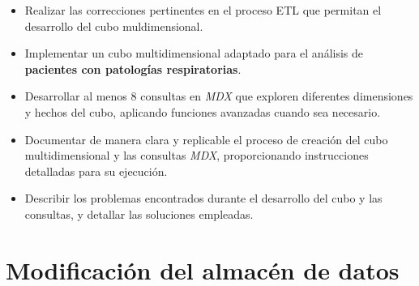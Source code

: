\documentclass[12pt, a4paper, twoside]{article}
\begin{document}
	\begin{itemize}
		\item Realizar las correcciones pertinentes en el proceso ETL que permitan el desarrollo del cubo muldimensional.
		\item Implementar un cubo multidimensional adaptado para el análisis de \textbf{pacientes con patologías respiratorias}.
		\item Desarrollar al menos 8 consultas en \textit{MDX} que exploren diferentes dimensiones y hechos del cubo, aplicando funciones avanzadas cuando sea necesario.
		\item Documentar de manera clara y replicable el proceso de creación del cubo multidimensional y las consultas \textit{MDX}, proporcionando instrucciones detalladas para su ejecución.
		\item Describir los problemas encontrados durante el desarrollo del cubo y las consultas, y detallar las soluciones empleadas.
	\end{itemize}
	
	
	 
	
	\section{Modificación del almacén de datos}
	
\end{document}
